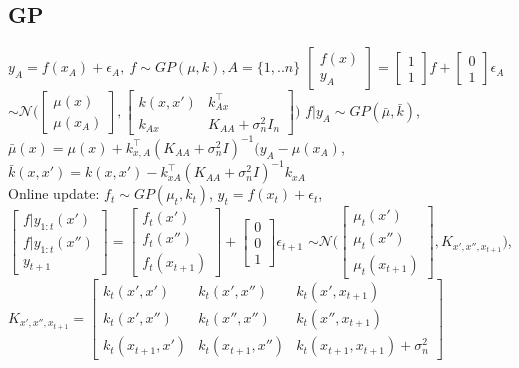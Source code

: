 \subsection{GP}
$y_{A}=f(x_{A})+\epsilon_{A},\ f\sim GP(\mu, k), A=\{1,..n\}$
$\begin{bmatrix} f(x) \\ y_{A}\end{bmatrix} = \begin{bmatrix} 1 \\ 1\end{bmatrix} f + \begin{bmatrix} 0 \\ 1 \end{bmatrix}\epsilon_{A}$
$\sim \mathcal{N}\big( \begin{bmatrix} \mu(x) \\ \mu(x_{A})\end{bmatrix},
    \begin{bmatrix} k(x,x') & k_{Ax}^{\top} \\ k_{Ax} & K_{AA}+\sigma_{n}^{2}I_{n}\end{bmatrix} \big)$
$f|y_{A} \sim GP(\bar{\mu}, \bar{k})$,
$\bar{\mu}(x) = \mu(x) + k_{x,A}^{\top}(K_{AA}+\sigma_{n}^{2}I)^{-1}(y_{A}-\mu(x_{A})$,
$\bar{k}(x,x')= k(x,x')-k_{xA}^{\top}(K_{AA}+\sigma_{n}^{2}I)^{-1}k_{xA}$\\
Online update:
$f_{t} \sim GP(\mu_{t}, k_{t})$, $y_{t}=f(x_{t})+\epsilon_{t}$,
$\begin{bmatrix} f|y_{1:t}(x') \\ f|y_{1:t}(x'')\\ y_{t+1}\end{bmatrix} =
\begin{bmatrix} f_{t}(x') \\ f_{t}(x'') \\ f_{t}(x_{t+1}) \end{bmatrix} +
\begin{bmatrix} 0 \\ 0 \\ 1 \end{bmatrix}\epsilon_{t+1}$
$\sim \mathcal{N}\big(\begin{bmatrix} \mu_{t}(x') \\ \mu_{t}(x'') \\ \mu_{t}(x_{t+1}) \end{bmatrix}, K_{x',x'',x_{t+1}} \big)$,
$K_{x',x'',x_{t+1}} = \begin{bmatrix} k_{t}(x',x') & k_{t}(x',x'') & k_{t}(x',x_{t+1})\\
    k_{t}(x',x'') & k_{t}(x'',x'') & k_{t}(x'',x_{t+1}) \\
    k_{t}(x_{t+1},x') & k_{t}(x_{t+1},x'') & k_{t}(x_{t+1},x_{t+1})+\sigma_{n}^{2}\end{bmatrix}$


